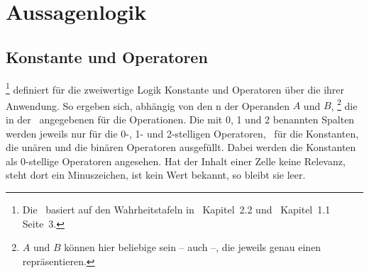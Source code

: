\section{Aussagenlogik}%
\label{sec:Aussagenlogik}

\subsection{Konstante und Operatoren}%
\label{sub:Operatoren}

%
\footnote{%
	Die \tablename\ basiert auf den Wahrheitstafeln in~\cite{bib:Junktor} Kapitel~2.2 und~\cite{bib:Rautenberg} Kapitel~1.1 Seite~3.
}
definiert für die zweiwertige Logik Konstante und Operatoren über die  ihrer Anwendung.
So ergeben sich, abhängig von den n der Operanden $A$ und $B$,%
\footnote{%
	$A$ und $B$ können hier beliebige  sein -- auch  --, die jeweils genau einen  repräsentieren.
}
die in der \tablename\ angegebenen  für die Operationen.
Die mit 0, 1 und 2 benannten Spalten werden jeweils nur für die 0-, 1- und 2-stelligen Operatoren, \textdh\ für die Konstanten, die unären und die binären Operatoren ausgefüllt.
Dabei werden die Konstanten als 0-stellige Operatoren angesehen.
Hat der Inhalt einer Zelle keine Relevanz, steht dort ein Minuszeichen, ist kein Wert bekannt, so bleibt sie leer.

